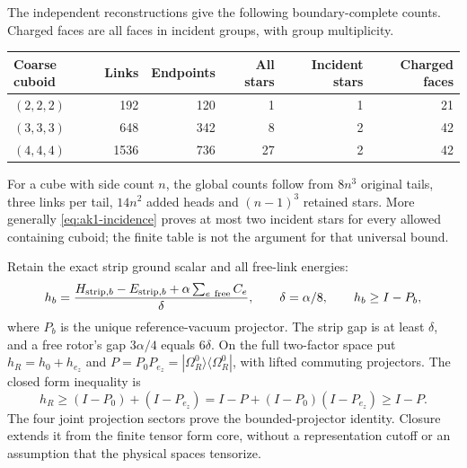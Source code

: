 The independent reconstructions give the following boundary-complete counts. Charged faces are all faces in incident groups, with group multiplicity.
\begin{center}\small
\begin{tabular}{@{}lrrrrr@{}}
\toprule Coarse cuboid & Links & Endpoints & All stars & Incident stars & Charged faces \\
\midrule
$(2,2,2)$ & 192 & 120 & 1 & 1 & 21\\
$(3,3,3)$ & 648 & 342 & 8 & 2 & 42\\
$(4,4,4)$ & 1536 & 736 & 27 & 2 & 42\\
\bottomrule
\end{tabular}
\end{center}
For a cube with side count $n$, the global counts follow from $8n^3$ original tails, three links per tail, $14n^2$ added heads and $(n-1)^3$ retained stars. More generally \eqref{eq:ak1-incidence} proves at most two incident stars for every allowed containing cuboid; the finite table is not the argument for that universal bound.

Retain the exact strip ground scalar and all free-link energies:
\begin{equation}
 h_b=\frac{H_{{\rm strip},b}-E_{{\rm strip},b}
                    +\alpha\sum_{e\ {\rm free}}C_e}{\delta},
 \qquad\delta=\alpha/8,\qquad h_b\ge I-P_b,
 \label{eq:ak1-reference}
\end{equation}
where $P_b$ is the unique reference-vacuum projector. The strip gap is at least $\delta$, and a free rotor's gap $3\alpha/4$ equals $6\delta$. On the full two-factor space put $h_R=h_0+h_{e_z}$ and $P=P_0P_{e_z}=|\Omega_R^0\rangle\langle\Omega_R^0|$, with lifted commuting projectors. The closed form inequality is
\begin{equation}
 h_R\ge(I-P_0)+(I-P_{e_z})
      =I-P+(I-P_0)(I-P_{e_z})\ge I-P.
 \label{eq:ak1-projector}
\end{equation}
The four joint projection sectors prove the bounded-projector identity. Closure extends it from the finite tensor form core, without a representation cutoff or an assumption that the physical spaces tensorize.

